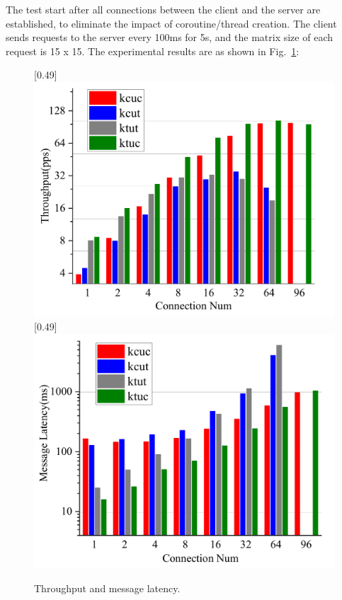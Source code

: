 \documentclass[sigconf,review,anonymous]{acmart}
\begin{document}
The test start after all connections between the client and the server are established, to eliminate the impact of coroutine/thread creation. The client sends requests to the server every 100ms for 5s, and the matrix size of each request is 15 x 15. The experimental results are as shown in Fig.~\ref{fig:throughput-latency}:

\begin{figure}[ht]
    \centering
    [0.49\linewidth]
    {
    \includegraphics[width=\linewidth]{assets/throughput.pdf}
    }
    [0.49\linewidth]
    {
    \includegraphics[width=\linewidth]{assets/latency.pdf}
    }
    \caption{Throughput and message latency.}
    \label{fig:throughput-latency}
\end{figure}
\end{document}
